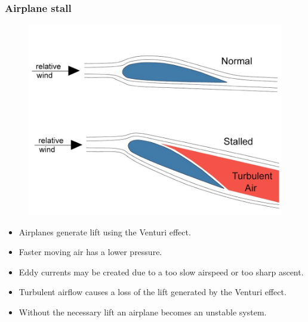 \begin{frame}
	\frametitle{Airplane stall}
	\begin{figure}
		\centering
		\includegraphics[height=0.7\textheight]{Images/discrete_time_systems_30}
		\label{fig:discrete_time_systems_30}
	\end{figure}
\end{frame}
\begin{frame}
	\begin{itemize}
		\item Airplanes generate lift using the Venturi effect.
		\item Faster moving air has a lower pressure.
		\item Eddy currents may be created due to a too slow airspeed or too sharp ascent.
		\item Turbulent airflow causes a loss of the lift generated by the Venturi effect.
		\item Without the necessary lift an airplane becomes an unstable system.
	\end{itemize}
\end{frame}
